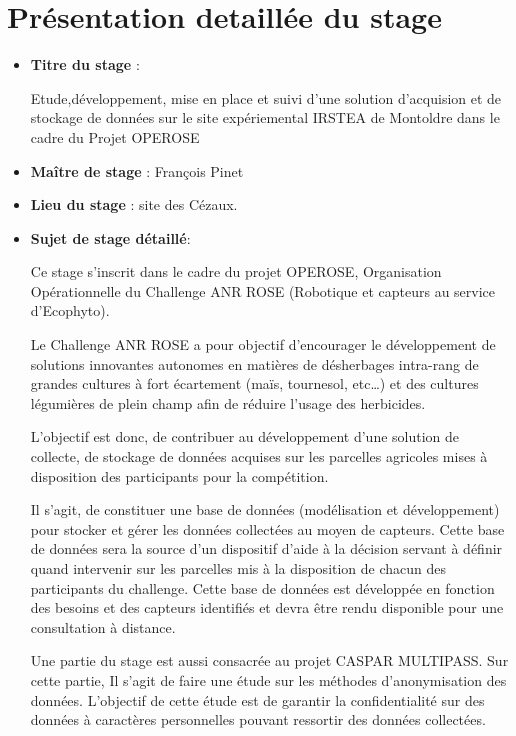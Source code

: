 \chapter{Présentation detaillée du stage}

\begin{itemize}

 \item \textbf{Titre du stage} :

 Etude,développement, mise en place  et suivi d'une solution d'acquision et de stockage de données sur le site expériemental IRSTEA de Montoldre dans le cadre du Projet OPEROSE
 \item \textbf{Maître de stage} : François Pinet
 \item \textbf{Lieu du stage} : site des Cézaux.

\item \textbf{Sujet de stage détaillé}: 

Ce stage s’inscrit dans le cadre du projet OPEROSE, Organisation Opérationnelle du Challenge ANR ROSE (Robotique et capteurs au service d’Ecophyto). 

Le Challenge ANR ROSE a pour objectif d’encourager le développement de solutions innovantes autonomes en matières de désherbages intra-rang de grandes cultures à fort écartement (maïs, tournesol, etc…) et des cultures légumières de plein champ afin de réduire l’usage des herbicides.

L’objectif est donc, de contribuer au développement d’une solution de collecte, de stockage de données acquises sur les parcelles agricoles mises à disposition des participants pour la compétition.

Il s’agit, de constituer une base de données (modélisation et développement) pour stocker et gérer les données collectées au moyen de capteurs. Cette base de données sera la source d’un dispositif d’aide à la décision servant à définir quand intervenir sur les parcelles mis à la disposition de chacun des participants du challenge. Cette base de données est développée en fonction des besoins et des capteurs identifiés et devra être rendu disponible pour une consultation à distance.

Une partie du stage est aussi consacrée au projet CASPAR MULTIPASS. Sur cette partie, Il s’agit de faire une étude sur les méthodes d’anonymisation des données. L’objectif de cette étude est de garantir la confidentialité sur des données à caractères personnelles pouvant ressortir des données collectées.

\end{itemize}
